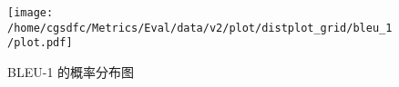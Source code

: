 \begin{figure}[H]%
\centering%
\texttt{[image: /home/cgsdfc/Metrics/Eval/data/v2/plot/distplot\_grid/bleu\_1/plot.pdf]}%
\caption{BLEU{-}1 的概率分布图}%
\label{fig:BLEU{-}1dist}%
\end{figure}